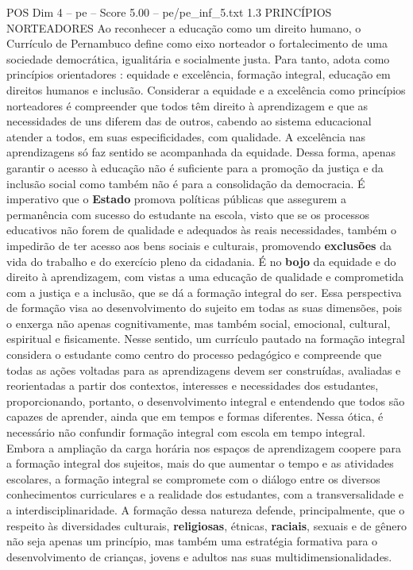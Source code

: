 \begin{textsample}{POS Dim 4 – pe – Score 5.00 – pe/pe\_inf\_5.txt}  \label{ex:f4_pos_279}
1.3 PRINCÍPIOS NORTEADORES Ao reconhecer a educação como um direito humano, o Currículo de Pernambuco define como eixo norteador o fortalecimento de uma sociedade democrática, igualitária e socialmente justa.
Para tanto, adota como princípios orientadores : equidade e excelência, formação integral, educação em direitos humanos e inclusão.
Considerar a equidade e a excelência como princípios norteadores é compreender que todos têm direito à aprendizagem e que as necessidades de uns diferem das de outros, cabendo ao sistema educacional atender a todos, em suas especificidades, com qualidade.
A excelência nas aprendizagens só faz sentido se acompanhada da equidade.
Dessa forma, apenas garantir o acesso à educação não é suficiente para a promoção da justiça e da inclusão social como também não é para a consolidação da democracia.
É imperativo que o \textbf{Estado} promova políticas públicas que assegurem a permanência com sucesso do estudante na escola, visto que se os processos educativos não forem de qualidade e adequados às reais necessidades, também o impedirão de ter acesso aos bens sociais e culturais, promovendo \textbf{exclusões} da vida do trabalho e do exercício pleno da cidadania.
É no \textbf{bojo} da equidade e do direito à aprendizagem, com vistas a uma educação de qualidade e comprometida com a justiça e a inclusão, que se dá a formação integral do ser.
Essa perspectiva de formação visa ao desenvolvimento do sujeito em todas as suas dimensões, pois o enxerga não apenas cognitivamente, mas também social, emocional, cultural, espiritual e fisicamente.
Nesse sentido, um currículo pautado na formação integral considera o estudante como centro do processo pedagógico e compreende que todas as ações voltadas para as aprendizagens devem ser construídas, avaliadas e reorientadas a partir dos contextos, interesses e necessidades dos estudantes, proporcionando, portanto, o desenvolvimento integral e entendendo que todos são capazes de aprender, ainda que em tempos e formas diferentes.
Nessa ótica, é necessário não confundir formação integral com escola em tempo integral.
Embora a ampliação da carga horária nos espaços de aprendizagem coopere para a formação integral dos sujeitos, mais do que aumentar o tempo e as atividades escolares, a formação integral se compromete com o diálogo entre os diversos conhecimentos curriculares e a realidade dos estudantes, com a transversalidade e a interdisciplinaridade.
A formação dessa natureza defende, principalmente, que o respeito às diversidades culturais, \textbf{religiosas}, étnicas, \textbf{raciais}, sexuais e de gênero não seja apenas um princípio, mas também uma estratégia formativa para o desenvolvimento de crianças, jovens e adultos nas suas multidimensionalidades.

\end{textsample}
